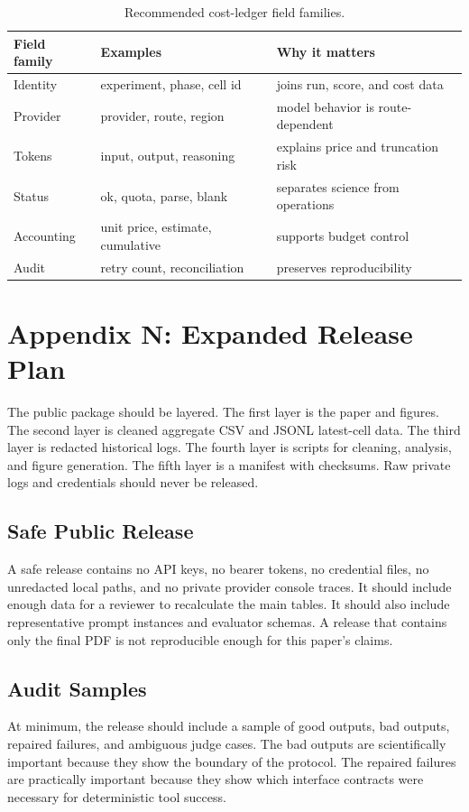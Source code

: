 \documentclass[11pt]{article}
\begin{document}
\begin{table}[ht]
\centering
\small
\begin{tabular}{lll}
\toprule
Field family & Examples & Why it matters \\
\midrule
Identity & experiment, phase, cell id & joins run, score, and cost data \\
Provider & provider, route, region & model behavior is route-dependent \\
Tokens & input, output, reasoning & explains price and truncation risk \\
Status & ok, quota, parse, blank & separates science from operations \\
Accounting & unit price, estimate, cumulative & supports budget control \\
Audit & retry count, reconciliation & preserves reproducibility \\
\bottomrule
\end{tabular}
\caption{Recommended cost-ledger field families.}
\end{table}

\section{Appendix N: Expanded Release Plan}
The public package should be layered. The first layer is the paper and figures. The second layer is cleaned aggregate CSV and JSONL latest-cell data. The third layer is redacted historical logs. The fourth layer is scripts for cleaning, analysis, and figure generation. The fifth layer is a manifest with checksums. Raw private logs and credentials should never be released.

\subsection{Safe Public Release}
A safe release contains no API keys, no bearer tokens, no credential files, no unredacted local paths, and no private provider console traces. It should include enough data for a reviewer to recalculate the main tables. It should also include representative prompt instances and evaluator schemas. A release that contains only the final PDF is not reproducible enough for this paper's claims.

\subsection{Audit Samples}
At minimum, the release should include a sample of good outputs, bad outputs, repaired failures, and ambiguous judge cases. The bad outputs are scientifically important because they show the boundary of the protocol. The repaired failures are practically important because they show which interface contracts were necessary for deterministic tool success.
\end{document}
